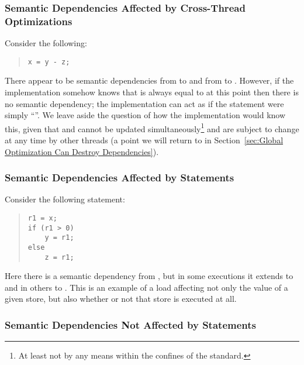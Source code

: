 \subsubsection{Semantic Dependencies Affected by Cross-Thread Optimizations}
\label{sec:Semantic Dependencies Affected by Cross-Thread Optimizations}

Consider the following:
\begin{quote}
\begin{verbatim}
x = y - z;
\end{verbatim}
\end{quote}
There appear to be semantic dependencies from  to  and from 
to .
However, if the implementation somehow knows that  is
always equal to  at this point then there is no semantic dependency;
the implementation can act as if the statement were simply ``''.
We leave aside the question of how the implementation would know this,
given that  and  cannot be updated simultaneously\footnote{
	At least not by any means within the confines of the standard.}
and are subject to change at any time by
other threads (a point we will return to in
Section~\ref{sec:Global Optimization Can Destroy Dependencies}).

\subsubsection{Semantic Dependencies Affected by  Statements}
\label{sec:Semantic Dependencies Affected by if Statements}

Consider the following  statement:
\begin{quote}
\begin{verbatim}
r1 = x;
if (r1 > 0)
    y = r1;
else
    z = r1;
\end{verbatim}
\end{quote}
Here there is a semantic dependency from , but in some executions
it extends to  and in others to .
This is an example of a load affecting not only the value of
a given store, but also whether or not that store is executed at all.

\subsubsection{Semantic Dependencies Not Affected by  Statements}
\label{sec:Semantic Dependencies Not Affected by if Statements}

